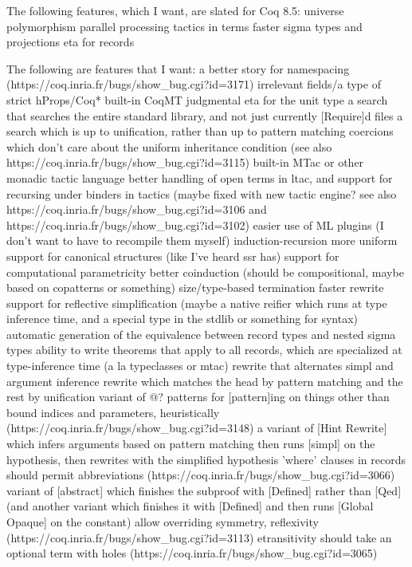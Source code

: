 \documentclass{beamer}
\begin{document}
\begin{frame}
The following features, which I want, are slated for Coq 8.5:
universe polymorphism
parallel processing
tactics in terms
faster sigma types and projections
eta for records

The following are features that I want:
a better story for namespacing (https://coq.inria.fr/bugs/show\_bug.cgi?id=3171)
irrelevant fields/a type of strict hProps/Coq*
built-in CoqMT
judgmental eta for the unit type
a search that searches the entire standard library, and not just currently [Require]d files
a search which is up to unification, rather than up to pattern matching
coercions which don't care about the uniform inheritance condition (see also https://coq.inria.fr/bugs/show\_bug.cgi?id=3115)
built-in MTac or other monadic tactic language
better handling of open terms in ltac, and support for recursing under binders in tactics (maybe fixed with new tactic engine? see also https://coq.inria.fr/bugs/show\_bug.cgi?id=3106 and https://coq.inria.fr/bugs/show\_bug.cgi?id=3102)
easier use of ML plugins (I don't want to have to recompile them myself)
induction-recursion
more uniform support for canonical structures (like I've heard ssr has)
support for computational parametricity
better coinduction (should be compositional, maybe based on copatterns or something)
size/type-based termination
faster rewrite
support for reflective simplification (maybe a native reifier which runs at type inference time, and a special type in the stdlib or something for syntax)
automatic generation of the equivalence between record types and nested sigma types
ability to write theorems that apply to all records, which are specialized at type-inference time (a la typeclasses or mtac)
rewrite that alternates simpl and argument inference
rewrite which matches the head by pattern matching and the rest by unification
variant of @? patterns for [pattern]ing on things other than bound indices and parameters, heuristically (https://coq.inria.fr/bugs/show\_bug.cgi?id=3148)
a variant of [Hint Rewrite] which infers arguments based on pattern matching then runs [simpl] on the hypothesis, then rewrites with the simplified hypothesis
'where' clauses in records should permit abbreviations (https://coq.inria.fr/bugs/show\_bug.cgi?id=3066)
variant of [abstract] which finishes the subproof with [Defined] rather than [Qed] (and another variant which finishes it with [Defined] and then runs [Global Opaque] on the constant)
allow overriding symmetry, reflexivity (https://coq.inria.fr/bugs/show\_bug.cgi?id=3113)
etransitivity should take an optional term with holes (https://coq.inria.fr/bugs/show\_bug.cgi?id=3065)

\end{frame}
\end{document}
